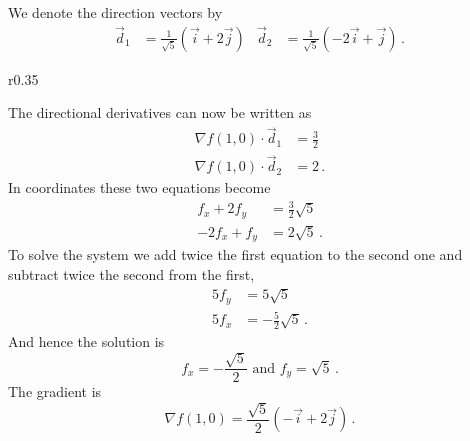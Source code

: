 \begin{solution}
We denote the direction vectors by
\begin{align*}
\vec d_1 &= \frac{1}{\sqrt 5}\left( \vec i + 2 \vec j \right) &
\vec d_2 &= \frac{1}{\sqrt 5}\left( -2 \vec i + \vec j \right)\,.
\end{align*}
\begin{wrapfigure}{r}{0.35\textwidth}
\centering
\end{wrapfigure}
The directional derivatives can now be written as
\begin{align*}
\nabla f(1,0) \cdot \vec d_1 &= \frac 32 \\
\nabla f(1,0) \cdot \vec d_2 &= 2\,.
\end{align*}
In coordinates these two equations become
\begin{align*}
f_x + 2f_y &= \frac 32 \sqrt{5} \\
-2f_x + f_y &= 2 \sqrt{5}\,.
\end{align*}
To solve the system we add twice the first equation to the second one and subtract twice the second from the first,
\begin{align*}
5 f_y &= 5 \sqrt{5} \\
5 f_x &= -\frac 52 \sqrt{5}\,.
\end{align*}
And hence the solution is
\[
f_x = -\frac{\sqrt{5}}2 \text{ and } f_y = \sqrt{5}\,.
\]
The gradient is
\[
\nabla f(1,0) = \frac{\sqrt{5}}{2} \left( -\vec i + 2\vec j \right)\,.
\]
\end{solution}

